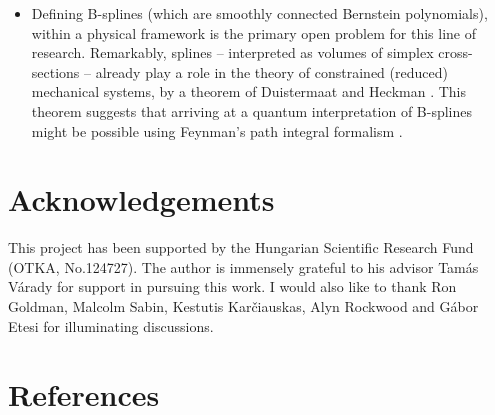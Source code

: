 \documentclass[12pt,final,3p]{elsarticle}
\begin{document}
\begin{itemize}
	\item Defining B-splines (which are smoothly connected Bernstein polynomials), within a physical framework is the primary open problem for this line of research. Remarkably, splines -- interpreted as volumes of simplex cross-sections \cite{deconcini2010topics,cohen1987cones} -- already play a role in the theory of constrained (reduced) mechanical systems, by a theorem of Duistermaat and Heckman \cite{duistermaat1982variation,atiyah1983angular}. This theorem suggests that arriving at a quantum interpretation of B-splines might be possible using Feynman's path integral formalism \cite{szabo2003equivariant}.   
\end{itemize}

\section*{Acknowledgements}
This project has been supported by the Hungarian Scientific Research Fund (OTKA, No.124727). The author is immensely grateful to his advisor Tam\'{a}s V\'{a}rady for support in pursuing this work. I would also like to thank Ron Goldman, Malcolm Sabin, Kestutis Kar\v{c}iauskas, Alyn Rockwood and G\'{a}bor Etesi for illuminating discussions. 

\section*{References}


\end{document}

